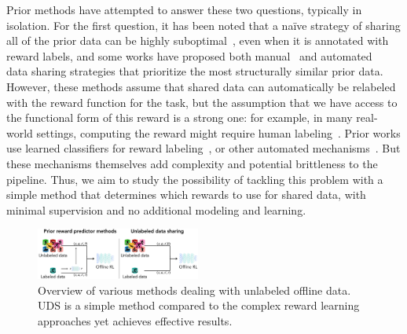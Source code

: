 \documentclass[../thesis.tex]{subfiles}
\begin{document}
Prior methods have attempted to answer these two questions, typically in isolation. For the first question, it has been noted that a na\"{i}ve strategy of sharing all of the prior data can be highly suboptimal~\citep{kalashnikov2021mt}, even when it is annotated with reward labels, and some works have proposed both manual~\citep{kalashnikov2021mt} and automated~\citep{yu2021conservative,eysenbach2020rewriting} data sharing strategies that prioritize the most structurally similar prior data. 
However, these methods assume that shared data can automatically be relabeled with the reward function for the task,
but the assumption that we have access to the functional form of this reward is a strong one: for example, in many real-world settings, computing the reward might require human labeling~\citep{cabi2019scaling,finn2016deep}. 
Prior works use learned classifiers for reward labeling~\citep{VICEFu2018,xie2018few,singh2019end}, or other automated mechanisms~\citep{konyushkova2020semi}. But these mechanisms themselves add complexity and potential brittleness to the pipeline. Thus, we aim to study the possibility of tackling this problem with a simple method that determines which rewards to use for shared data, with minimal supervision and no additional modeling and learning.

\begin{figure}[ht]
    \centering
    \includegraphics[width=0.48\textwidth]{chapters/uds/teaser_new.png}
    \vspace{-0.6cm}
    \caption{\footnotesize  Overview of various methods dealing with unlabeled offline data. UDS is a simple method compared to the complex reward learning approaches yet achieves effective results.}
    \vspace{-0.55cm}
    \label{fig:uds_teaser}
\end{figure}
\end{document}
